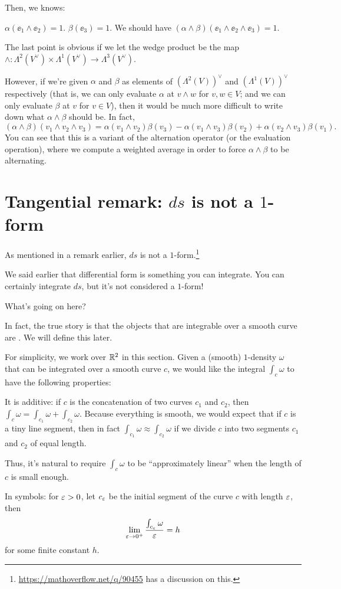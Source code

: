 Then, we knows:
\begin{itemize}
	\ii $\alpha(\ee_1 \wedge \ee_2) = 1$.
	\ii $\beta(\ee_3) = 1$.
	\ii We should have $(\alpha \wedge \beta)(\ee_1 \wedge \ee_2 \wedge \ee_3) = 1$.
\end{itemize}
The last point is obvious if we let the wedge product be the map $\wedge \colon
\Lambda^2(V^\vee) \times \Lambda^1(V^\vee) \to \Lambda^3(V^\vee)$.

However, if we're given $\alpha$ and $\beta$ as elements of $(\Lambda^2(V))^\vee$ and
$(\Lambda^1(V))^\vee$ respectively (that is, we can only evaluate $\alpha$ at $v \wedge w$ for $v, w
\in V$; and we can only evaluate $\beta$ at $v$ for $v \in V$), then it would be much more difficult
to write down what $\alpha \wedge \beta$ should be. In fact,
\[
	(\alpha \wedge \beta)(v_1 \wedge v_2 \wedge v_3) =
	\alpha(v_1 \wedge v_2) \beta(v_3)
	- \alpha(v_1 \wedge v_3) \beta(v_2)
	+ \alpha(v_2 \wedge v_3) \beta(v_1).
\]
You can see that this is a variant of the alternation operator (or the evaluation operation),
where we compute a weighted average in order to force $\alpha \wedge \beta$ to be alternating.

\section{Tangential remark: $ds$ is not a $1$-form}

As mentioned in a remark earlier, $ds$ is not a
$1$-form.\footnote{\url{https://mathoverflow.net/q/90455} has a discussion on this.}

We said earlier that differential form is something you can integrate. You can certainly integrate
$ds$, but it's not considered a $1$-form!

What's going on here?

In fact, the true story is that the objects that are integrable over a smooth curve are
. We will define this later.

For simplicity, we work over $\mathbb R^2$ in this section.
Given a (smooth) $1$-density $\omega$ that can be integrated over a smooth curve $c$,
we would like the integral $\int_c \omega$ to have the following properties:
\begin{itemize}
	\ii It is additive: if $c$ is the concatenation of two curves $c_1$ and $c_2$, then
	$\int_c \omega = \int_{c_1} \omega + \int_{c_2} \omega$.
	\ii Because everything is smooth, we would expect that if $c$ is a tiny line segment,
	then in fact $\int_{c_1} \omega \approx \int_{c_2} \omega$ if we divide $c$ into two segments
	$c_1$ and $c_2$ of equal length.

	Thus, it's natural to require $\int_c \omega$ to be ``approximately linear'' when the length of
	$c$ is small enough.

	In symbols: for $\varepsilon > 0$, let $c_\varepsilon$ be the initial segment of the curve $c$ with length
	$\varepsilon$, then
	\[ \lim_{\varepsilon \to 0^+} \frac{\int_{c_\varepsilon} \omega}{\varepsilon} = h \]
	for some finite constant $h$.
\end{itemize}

